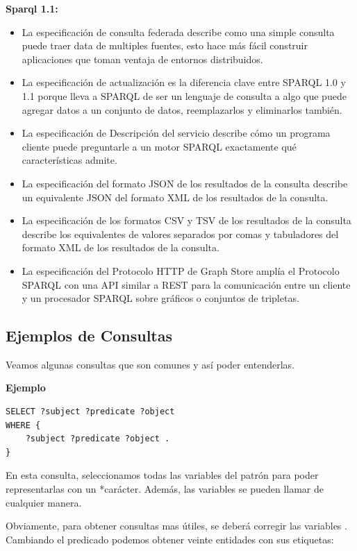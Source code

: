 \documentclass[conference]{IEEEtran}
\begin{document}
\textbf{Sparql 1.1:}
\begin{itemize}
	\item La especificación de consulta federada describe como una simple consulta puede traer data de multiples fuentes, esto hace más fácil construir aplicaciones que toman ventaja de entornos distribuidos.
	\item La especificación de actualización es la diferencia clave entre SPARQL 1.0 y 1.1 porque lleva a SPARQL de ser un lenguaje de consulta a algo que puede agregar datos a un conjunto de datos, reemplazarlos y eliminarlos también.
	\item La especificación de Descripción del servicio describe cómo un programa cliente puede preguntarle a un motor SPARQL exactamente qué características admite.
	\item La especificación del formato JSON de los resultados de la consulta describe un equivalente JSON del formato XML de los resultados de la consulta.
	\item La especificación de los formatos CSV y TSV de los resultados de la consulta describe los equivalentes de valores separados por comas y tabuladores del formato XML de los resultados de la consulta.
	\item La especificación del Protocolo HTTP de Graph Store amplía el Protocolo SPARQL con una API similar a REST para la comunicación entre un cliente y un procesador SPARQL sobre gráficos o conjuntos de tripletas.  \cite{b4}
	
\end{itemize}

\subsection{Ejemplos de Consultas}
Veamos algunas consultas que son comunes y así poder entenderlas.

\textbf{Ejemplo}
\begin{lstlisting}[captionpos=b, caption=SPARQL query, label=lst:sparql,
basicstyle=\ttfamily,frame=single]
SELECT ?subject ?predicate ?object
WHERE {
	?subject ?predicate ?object .
}
\end{lstlisting}


En esta consulta, seleccionamos todas las variables del patrón para poder representarlas con un *carácter. Además, las variables se pueden llamar de cualquier manera.

Obviamente, para obtener consultas mas útiles, se deberá corregir las variables . Cambiando el predicado podemos obtener veinte entidades con sus etiquetas:
\end{document}
